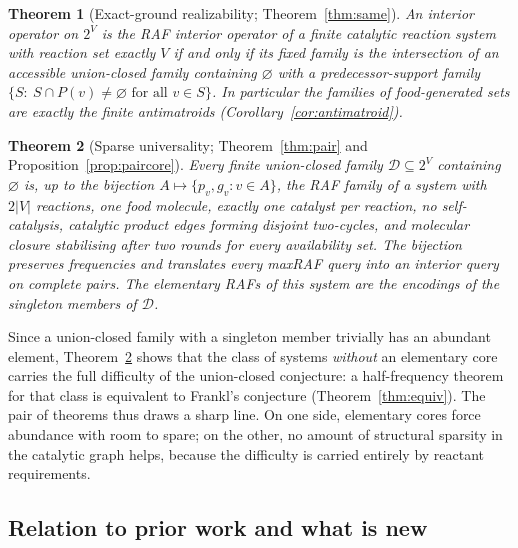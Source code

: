\documentclass[11pt,a4paper]{article}
\theoremstyle{plain}
\newtheorem{theorem}{Theorem}[section]
\theoremstyle{definition}
\theoremstyle{remark}
\newcommand{\DD}{\mathcal D}
\begin{document}
\begin{theorem}[Exact-ground realizability; Theorem~\ref{thm:same}]\label{thm:intro-same}
An interior operator on $2^V$ is the RAF interior operator of a finite catalytic reaction
system with reaction set exactly $V$ if and only if its fixed family is the intersection of
an accessible union-closed family containing $\varnothing$ with a predecessor-support family
$\{S:\ S\cap P(v)\neq\varnothing\text{ for all }v\in S\}$.
In particular the families of food-generated sets are exactly the finite antimatroids
(Corollary~\ref{cor:antimatroid}).
\end{theorem}

\begin{theorem}[Sparse universality; Theorem~\ref{thm:pair} and Proposition~\ref{prop:paircore}]\label{thm:intro-pair}
Every finite union-closed family $\DD\subseteq2^V$ containing $\varnothing$ is, up to the
bijection $A\mapsto\{p_v,g_v:v\in A\}$, the RAF family of a system with $2|V|$ reactions,
one food molecule, exactly one catalyst per reaction, no self-catalysis, catalytic
product edges forming disjoint two-cycles, and molecular closure stabilising after two
rounds for every availability set. The bijection preserves frequencies and translates
every maxRAF query into an interior query on complete pairs. The elementary RAFs of this
system are the encodings of the singleton members of $\DD$.
\end{theorem}

Since a union-closed family with a singleton member trivially has an abundant element,
Theorem~\ref{thm:intro-pair} shows that the class of systems \emph{without} an elementary
core carries the full difficulty of the union-closed conjecture: a half-frequency theorem
for that class is equivalent to Frankl's conjecture (Theorem~\ref{thm:equiv}). The pair of
theorems thus draws a sharp line. On one side, elementary cores force abundance with room
to spare; on the other, no amount of structural sparsity in the catalytic graph helps, because
the difficulty is carried entirely by reactant requirements.

\subsection{Relation to prior work and what is new}
\end{document}
